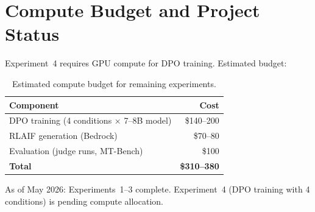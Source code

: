 \documentclass[11pt]{article}
\begin{document}
\section{Compute Budget and Project Status}
\label{sec:compute-budget}

Experiment~4 requires GPU compute for DPO training.
Estimated budget:

\begin{table}[h]
\centering
\caption{Estimated compute budget for remaining experiments.}
\label{tab:compute-budget}
\begin{tabular}{@{}lr@{}}
\toprule
\textbf{Component} & \textbf{Cost} \\
\midrule
DPO training (4 conditions $\times$ 7--8B model) & \$140--200 \\
RLAIF generation (Bedrock) & \$70--80 \\
Evaluation (judge runs, MT-Bench) & \$100 \\
\midrule
\textbf{Total} & \textbf{\$310--380} \\
\bottomrule
\end{tabular}
\end{table}

\noindent As of May 2026: Experiments~1--3 complete. Experiment~4 (DPO training with 4 conditions) is pending compute allocation.




\end{document}
